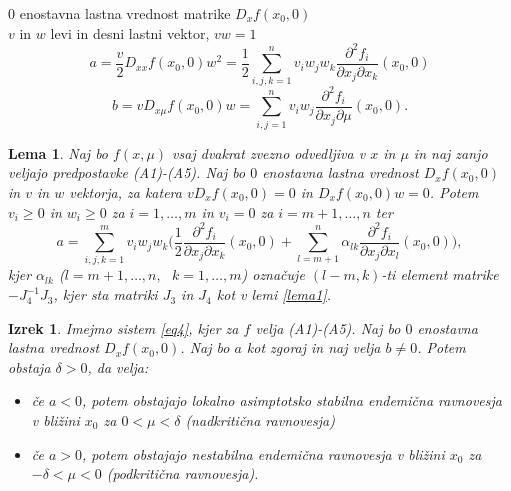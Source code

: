 \documentclass[11pt]{beamer}
\newtheorem{lema}{Lema}
\newtheorem{izrek}{Izrek}
\begin{document}
\begin{frame}
    \(0\) enostavna lastna vrednost matrike \(D_xf(x_0,0)\)\\
    \(v\) in \(w\) levi in desni lastni vektor, \(vw=1\)\\
    \begin{equation}\label{eq5}
        a=\frac{v}{2}D_{xx}f(x_0,0)w^2=\frac{1}{2}\sum_{i,j,k=1}^n v_iw_jw_k\frac{\partial^2f_i}{\partial x_j \partial x_k}(x_0,0)
        \end{equation}
        \[b=vD_{x\mu}f(x_0,0)w=\sum_{i,j=1}^n v_i w_j \frac{\partial^2 f_i}{\partial x_j \partial \mu}(x_0,0).\]
\end{frame}

\begin{frame}
    \begin{lema}\label{lema2}
        Naj bo \(f(x,\mu)\) vsaj dvakrat zvezno odvedljiva v 
        \(x\) in \(\mu\) in naj zanjo veljajo predpostavke (A1)-(A5).
        Naj bo \(0\) enostavna lastna vrednost \(D_xf(x_0,0)\) in \(v\) in \(w\)
        vektorja, za katera \(vD_xf(x_0,0)=0\) in \(D_xf(x_0,0)w=0\). 
        Potem \(v_i\geq 0\) in \(w_i\geq 0\) za \(i=1,\ldots, m\) in 
        \(v_i=0\) za \(i=m+1,\ldots,n\) ter 
        \[a=\sum_{i,j,k=1}^m v_i w_j w_k \big(\frac{1}{2}\frac{\partial^2 f_i}{\partial x_j \partial x_k}(x_0,0)+\sum_{l=m+1}^n \alpha_{lk}\frac{\partial^2 f_i}{\partial x_j \partial x_l}(x_0,0)\big),\]
        kjer \(\alpha_{lk}\) (\(l=m+1,\ldots,n,\textrm{ }k=1,\ldots,m\)) označuje 
        \((l-m,k)\)-ti element matrike \(-J_4^{-1}J_3\), kjer sta matriki \(J_3\) in \(J_4\)
        kot v lemi \ref{lema1}.
    \end{lema}
\end{frame}

\begin{frame}
    \begin{izrek}\label{izrek2}
        Imejmo sistem \ref{eq4}, kjer za \(f\) velja (A1)-(A5). Naj bo \(0\) enostavna
        lastna vrednost \(D_xf(x_0,0)\). Naj bo \(a\) kot zgoraj in naj velja \(b\neq 0\).
        Potem obstaja \(\delta >0\), da velja:
        \begin{itemize}
            \item če \(a<0\), potem obstajajo lokalno asimptotsko stabilna endemična ravnovesja
            v bližini \(x_0\) za \(0<\mu <\delta\) (nadkritična ravnovesja)
            \item če \(a>0\), potem obstajajo nestabilna endemična ravnovesja v bližini \(x_0\) 
            za \(-\delta < \mu < 0\) (podkritična ravnovesja).
        \end{itemize}
    \end{izrek}
\end{frame}
\end{document}
